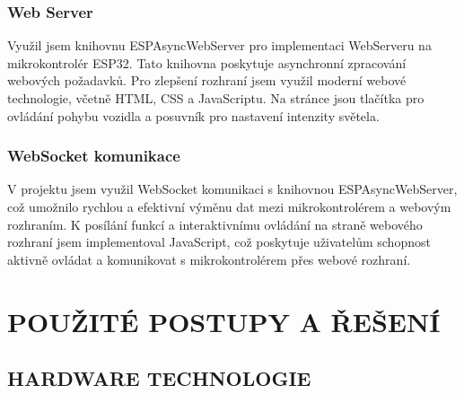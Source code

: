 \documentclass[12pt, a4paper,
oneside,      %
openany
]{report}
\begin{document}
\subsection{Web Server}
\noindent Využil jsem knihovnu ESPAsyncWebServer pro implementaci WebServeru na mikrokontrolér ESP32. Tato knihovna poskytuje asynchronní zpracování webových požadavků. Pro zlepšení rozhraní jsem využil moderní webové technologie, včetně HTML, CSS a JavaScriptu. Na stránce jsou tlačítka pro ovládání pohybu vozidla a posuvník pro nastavení intenzity světela.

\subsection{WebSocket komunikace}
\noindent V projektu jsem využil WebSocket komunikaci s knihovnou ESPAsyncWebServer, což umožnilo rychlou a efektivní výměnu dat mezi mikrokontrolérem a webovým rozhraním. K posílání funkcí a interaktivnímu ovládání na straně webového rozhraní jsem implementoval JavaScript, což poskytuje uživatelům schopnost aktivně ovládat a komunikovat s mikrokontrolérem přes webové rozhraní.

\chapter{POUŽITÉ POSTUPY A ŘEŠENÍ}

\section{HARDWARE TECHNOLOGIE}
\end{document}
